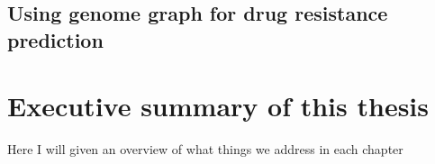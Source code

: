 \subsection{Using genome graph for drug resistance prediction}
\label{sec:genome-graphs-dst}


\section{Executive summary of this thesis}

Here I will given an overview of what things we address in each chapter